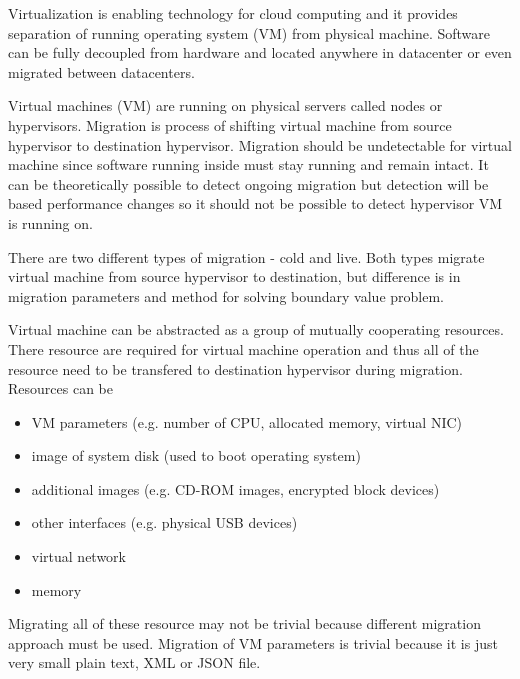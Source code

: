 


Virtualization is enabling technology for cloud computing and it provides separation of running operating system (\Ac{VM}) from physical machine. Software can be fully decoupled from hardware and located anywhere in datacenter or even migrated between datacenters. 

Virtual machines (\Ac{VM}) are running on physical servers called nodes or hypervisors. Migration is process of shifting virtual machine from source hypervisor to destination hypervisor. Migration should be undetectable for virtual machine since software running inside must stay running and remain intact. It can be theoretically possible to detect ongoing migration but detection will be based performance changes so it should not be possible to detect hypervisor \Ac{VM} is running on.


There are two different types of migration - cold and live. Both types migrate virtual machine from source hypervisor to destination, but difference is in migration parameters and method for solving boundary value problem.

Virtual machine can be abstracted as a group of mutually cooperating resources. There resource are required for virtual machine operation and thus all of the resource need to be transfered to destination hypervisor during migration. Resources can be
\begin{itemize}
	\item \Ac{VM} parameters (e.g. number of \Ac{CPU}, allocated memory, virtual \Ac{NIC})
	\item image of system disk (used to boot operating system)
	\item additional images (e.g. CD-ROM images, encrypted block devices)
	\item other interfaces (e.g. physical \Ac{USB} devices)
	\item virtual network
	\item memory
\end{itemize}
Migrating all of these resource may not be trivial because different migration approach must be used. Migration of \Ac{VM} parameters is trivial because it is just very small plain text, \Ac{XML} or \Ac{JSON} file.

